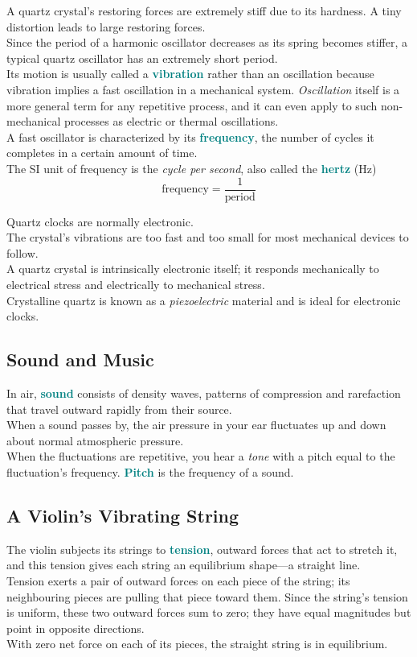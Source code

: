 \documentclass[12pt]{article}
\theoremstyle{definition}
\newcommand{\defnterm}[1]{\textbf{\textcolor{teal}{#1}}\index{#1}}
\begin{document}
A quartz crystal's restoring forces are extremely stiff due to its hardness.
A tiny distortion leads to large restoring forces. \\
Since the period of a harmonic oscillator decreases as its spring becomes stiffer, a typical quartz oscillator has an extremely short period. \\
Its motion is usually called a \defnterm{vibration} rather than an oscillation because vibration implies a fast oscillation in a mechanical system.
\emph{Oscillation} itself is a more general term for any repetitive process, and it can even apply to such non-mechanical processes as electric or thermal oscillations. \\

A fast oscillator is characterized by its \defnterm{frequency}, the number of cycles it completes in a certain amount of time. \\
The SI unit of frequency is the \emph{cycle per second}, also called the \defnterm{hertz} (Hz)
$$\text{frequency} = \frac{1}{\text{period}}$$

Quartz clocks are normally electronic. \\
The crystal's vibrations are too fast and too small for most mechanical devices to follow. \\
A quartz crystal is intrinsically electronic itself;
it responds mechanically to electrical stress and electrically to mechanical stress. \\
Crystalline quartz is known as a \emph{piezoelectric} material and is ideal for electronic clocks.

\subsection{Sound and Music}
In air, \defnterm{sound} consists of density waves, patterns of compression and rarefaction that travel outward rapidly from their source. \\
When a sound passes by, the air pressure in your ear fluctuates up and down about normal atmospheric pressure. \\

When the fluctuations are repetitive, you hear a \emph{tone} with a pitch equal to the fluctuation's frequency.
\defnterm{Pitch} is the frequency of a sound.

\subsection{A Violin's Vibrating String}
The violin subjects its strings to \defnterm{tension}, outward forces that act to stretch it, and this tension gives each string an equilibrium shape---a straight line. \\
Tension exerts a pair of outward forces on each piece of the string;
its neighbouring pieces are pulling that piece toward them.
Since the string's tension is uniform, these two outward forces sum to zero;
they have equal magnitudes but point in opposite directions. \\
With zero net force on each of its pieces, the straight string is in equilibrium. \\
\end{document}
